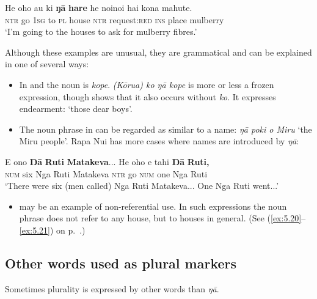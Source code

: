 \ea\label{ex:5.91}
\gll He oho au ki \textbf{ŋā} \textbf{hare} he no{\ꞌ}ino{\ꞌ}i hai kona mahute. \\
\textsc{ntr} go \textsc{1sg} to \textsc{pl} house \textsc{ntr} request:\textsc{red} \textsc{ins} place mulberry \\

\glt
‘I’m going to the houses to ask for mulberry fibres.’ \textstyleExampleref{[R352.025]} 
\z

Although these examples are unusual, they are grammatical and can be explained in one of several ways:

\begin{itemize}
\item 
In  and  the noun is \textit{kope}. \textit{(Kōrua) ko ŋā kope} is more or less a frozen expression, though  shows that it also occurs without \textit{ko}. It expresses endearment: ‘those dear boys’.

\item 
The noun phrase in  can be regarded as similar to a name: \textit{ŋā poki o Miru} ‘the Miru people’. Rapa Nui has more cases where names are introduced by \textit{ŋā}:

\end{itemize}

\ea\label{ex:5.92}
\gll E ono \textbf{Ŋā} \textbf{Ruti} \textbf{Matakeva}... He oho e tahi \textbf{Ŋā} \textbf{Ruti,} \\
\textsc{num} six Nga Ruti Matakeva \textsc{ntr} go \textsc{num} one Nga Ruti \\

\glt
‘There were six (men called) Nga Ruti Matakeva... One Nga Ruti went...’ \textstyleExampleref{[Mtx-3-11.001,005]}
\z

\begin{itemize}
\item 
	 may be an example of non-referential use. In such expressions the noun phrase does not refer to any house, but to houses in general. (See (\ref{ex:5.20}–\ref{ex:5.21}) on p.~\pageref{ex:5.20}.)
\end{itemize}
\subsection{Other words used as plural markers}\label{sec:5.5.3}

Sometimes plurality is expressed by other words than \textit{ŋā}. 

